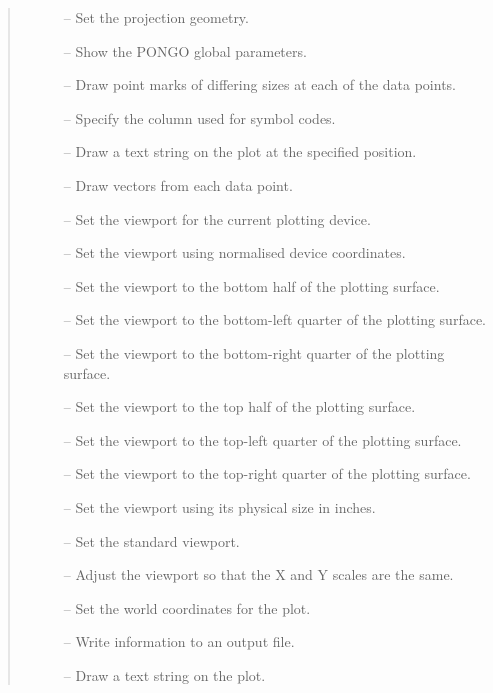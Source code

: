 \begin {quote}
\begin {description}
\item [] -- Set the projection geometry.
\item [] -- Show the PONGO global parameters.
\item [] -- Draw point marks of differing
                                        sizes at each of the data points.
\item [] -- Specify the column used for
                                          symbol codes.
\item [] -- Draw a text string on the plot at the specified
                       position.
\item [] -- Draw vectors from each data point.
\item [] -- Set the viewport for the current plotting device.
\item [] -- Set the viewport using normalised device coordinates.
\item [] -- Set the viewport to the bottom half of the plotting
                         surface.
\item [] -- Set the viewport to the bottom-left quarter of the
                         plotting surface.
\item [] -- Set the viewport to the bottom-right quarter of the
                         plotting surface.
\item [] -- Set the viewport to the top half of the plotting
                         surface.
\item [] -- Set the viewport to the top-left quarter of the
                         plotting surface.
\item [] -- Set the viewport to the top-right quarter of the
                         plotting surface.
\item [] -- Set the viewport using its physical size in inches.
\item [] -- Set the standard viewport.
\item [] -- Adjust the viewport so that the X and Y scales are the
                       same.
\item [] -- Set the world coordinates for the plot.
\item [] -- Write information to an output file.
\item [] -- Draw a text string on the plot.

\end{description}
\end{quote}
